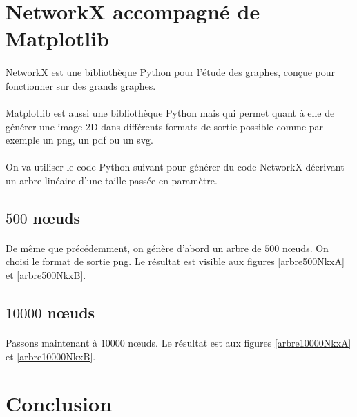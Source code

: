 	\section{NetworkX accompagné de Matplotlib}
	
\paragraph{}NetworkX est une bibliothèque Python pour l'étude des graphes, conçue pour fonctionner sur des grands graphes.

\paragraph{}Matplotlib est aussi une bibliothèque Python mais qui permet quant à elle de générer une image 2D dans différents formats de sortie possible comme par exemple un png, un pdf ou un svg.

\paragraph{}On va utiliser le code Python suivant pour générer du code NetworkX décrivant un arbre linéaire d'une taille passée en paramètre.


		\subsection{$500$ n\oe uds}
\paragraph{}De même que précédemment, on génère d'abord un arbre de $500$ n\oe uds. On choisi le format de sortie png. Le résultat est visible aux figures \ref{arbre500NkxA} et \ref{arbre500NkxB}.
		
		\subsection{$10000$ n\oe uds}
\paragraph{}Passons maintenant à $10000$ n\oe uds. Le résultat est aux figures \ref{arbre10000NkxA} et \ref{arbre10000NkxB}.
	
	\section{Conclusion}
	

